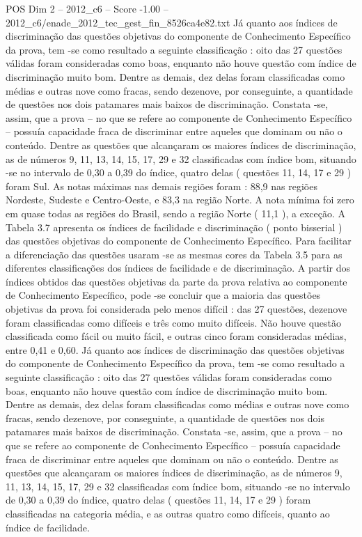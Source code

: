 \begin{textsample}{POS Dim 2 – 2012\_c6 – Score -1.00 – 2012\_c6/enade\_2012\_tec\_gest\_fin\_8526ca4e82.txt}
Já quanto aos índices de discriminação das questões objetivas do componente de Conhecimento Específico da prova, tem -se como resultado a seguinte classificação : oito das 27 questões válidas foram consideradas como boas, enquanto não houve questão com índice de discriminação muito bom.
Dentre as demais, dez delas foram classificadas como médias e outras nove como fracas, sendo dezenove, por conseguinte, a quantidade de questões nos dois patamares mais baixos de discriminação.
Constata -se, assim, que a prova – no que se refere ao componente de Conhecimento Específico – possuía capacidade fraca de discriminar entre aqueles que dominam ou não o conteúdo.
Dentre as questões que alcançaram os maiores índices de discriminação, as de números 9, 11, 13, 14, 15, 17, 29 e 32 classificadas com índice bom, situando -se no intervalo de 0,30 a 0,39 do índice, quatro delas ( questões 11, 14, 17 e 29 ) foram Sul.
As notas máximas nas demais regiões foram : 88,9 nas regiões Nordeste, Sudeste e Centro-Oeste, e 83,3 na região Norte.
A nota mínima foi zero em quase todas as regiões do Brasil, sendo a região Norte ( 11,1 ), a exceção.
A Tabela 3.7 apresenta os índices de facilidade e discriminação ( ponto bisserial ) das questões objetivas do componente de Conhecimento Específico.
Para facilitar a diferenciação das questões usaram -se as mesmas cores da Tabela 3.5 para as diferentes classificações dos índices de facilidade e de discriminação.
A partir dos índices obtidos das questões objetivas da parte da prova relativa ao componente de Conhecimento Específico, pode -se concluir que a maioria das questões objetivas da prova foi considerada pelo menos difícil : das 27 questões, dezenove foram classificadas como difíceis e três como muito difíceis.
Não houve questão classificada como fácil ou muito fácil, e outras cinco foram consideradas médias, entre 0,41 e 0,60.
Já quanto aos índices de discriminação das questões objetivas do componente de Conhecimento Específico da prova, tem -se como resultado a seguinte classificação : oito das 27 questões válidas foram consideradas como boas, enquanto não houve questão com índice de discriminação muito bom.
Dentre as demais, dez delas foram classificadas como médias e outras nove como fracas, sendo dezenove, por conseguinte, a quantidade de questões nos dois patamares mais baixos de discriminação.
Constata -se, assim, que a prova – no que se refere ao componente de Conhecimento Específico – possuía capacidade fraca de discriminar entre aqueles que dominam ou não o conteúdo.
Dentre as questões que alcançaram os maiores índices de discriminação, as de números 9, 11, 13, 14, 15, 17, 29 e 32 classificadas com índice bom, situando -se no intervalo de 0,30 a 0,39 do índice, quatro delas ( questões 11, 14, 17 e 29 ) foram classificadas na categoria média, e as outras quatro como difíceis, quanto ao índice de facilidade.

\end{textsample}
